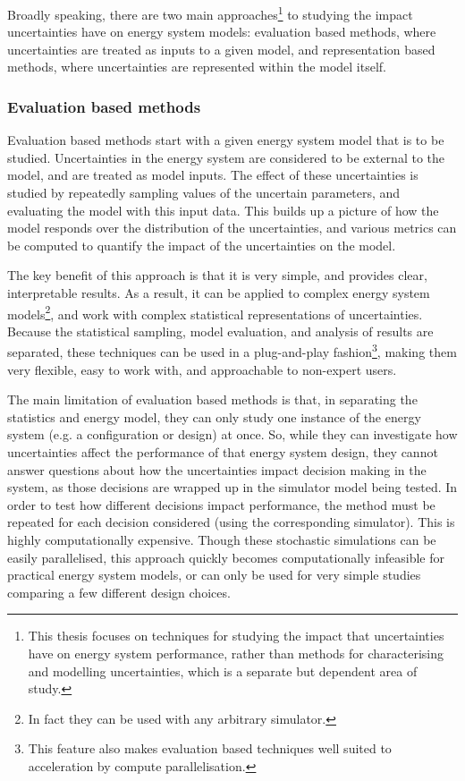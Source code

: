 Broadly speaking, there are two main approaches\footnote{This thesis focuses on techniques for studying the impact that uncertainties have on energy system performance, rather than methods for characterising and modelling uncertainties, which is a separate but dependent area of study.} to studying the impact uncertainties have on energy system models: evaluation based methods, where uncertainties are treated as inputs to a given model, and representation based methods, where uncertainties are represented within the model itself.


\subsubsection{Evaluation based methods}

Evaluation based methods start with a given energy system model that is to be studied. Uncertainties in the energy system are considered to be external to the model, and are treated as model inputs. The effect of these uncertainties is studied by repeatedly sampling values of the uncertain parameters, and evaluating the model with this input data. This builds up a picture of how the model responds over the distribution of the uncertainties, and various metrics can be computed to quantify the impact of the uncertainties on the model.

The key benefit of this approach is that it is very simple, and provides clear, interpretable results. As a result, it can be applied to complex energy system models\footnote{In fact they can be used with any arbitrary simulator.}, and work with complex statistical representations of uncertainties. Because the statistical sampling, model evaluation, and analysis of results are separated, these techniques can be used in a plug-and-play fashion\footnote{This feature also makes evaluation based techniques well suited to acceleration by compute parallelisation.}, making them very flexible, easy to work with, and approachable to non-expert users.

The main limitation of evaluation based methods is that, in separating the statistics and energy model, they can only study one instance of the energy system (e.g. a configuration or design) at once. So, while they can investigate how uncertainties affect the performance of that energy system design, they cannot answer questions about how the uncertainties impact decision making in the system, as those decisions are wrapped up in the simulator model being tested. In order to test how different decisions impact performance, the method must be repeated for each decision considered (using the corresponding simulator). This is highly computationally expensive. Though these stochastic simulations can be easily parallelised, this approach quickly becomes computationally infeasible for practical energy system models, or can only be used for very simple studies comparing a few different design choices.\\

